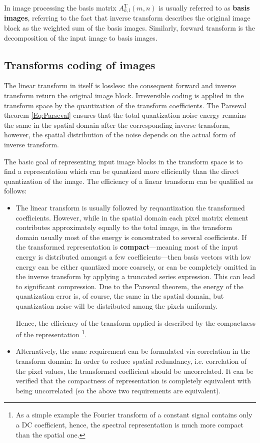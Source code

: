 In image processing the basis matrix $A_{k,l}^{\mathrm{T}}(m,n)$ is usually referred to as \textbf{basis images}, referring to the fact that inverse transform describes the original image block as the weighted sum of the basis images.
Similarly, forward transform is the decomposition of the input image to basis images.

\subsection{Transforms coding of images}

The linear transform in itself is lossless: the consequent forward and inverse transform return the original image block.
Irreversible coding is applied in the transform space by the quantization of the transform coefficients.
The Parseval theorem \eqref{Eq:Parseval} ensures that the total quantization noise energy remains the same in the spatial domain after the corresponding inverse transform, however, the spatial distribution of the noise depends on the actual form of inverse transform.

The basic goal of representing input image blocks in the transform space is to find a representation which can be quantized more efficiently than the direct quantization of the image.
The efficiency of a linear transform can be qualified as follows:
\begin{itemize}
\item The linear transform is usually followed by requantization the transformed coefficients.
However, while in the spatial domain each pixel matrix element contributes approximately equally to the total image, in the transform domain usually most of the energy is concentrated to several coefficients.
If the transformed representation is \textbf{compact}---meaning most of the input energy is distributed amongst a few coefficients---then basis vectors with low energy can be either quantized more coarsely, or can be completely omitted in the inverse transform by applying a truncated series expression.
This can lead to significant compression.
Due to the Parseval theorem, the energy of the quantization error is, of course, the same in the spatial domain, but quantization noise will be distributed among the pixels uniformly.

Hence, the efficiency of the transform applied is described by the compactness of the representation \footnote{As a simple example the Fourier transform of a constant signal contains only a DC coefficient, hence, the spectral representation is much more compact than the spatial one.}.
\item Alternatively, the same requirement can be formulated via correlation in the transform domain:
In order to reduce spatial redundancy, i.e. correlation of the pixel values, the transformed coefficient should be uncorrelated.
It can be verified that the compactness of representation is completely equivalent with being uncorrelated (so the above two requirements are equivalent).
\end{itemize}

